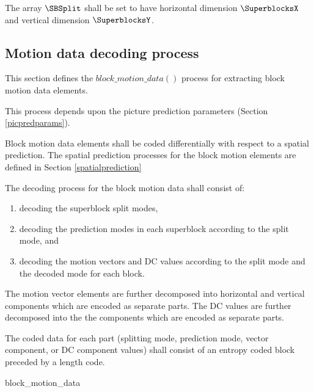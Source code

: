 The array $\SBSplit$ shall be set to have horizontal dimension $\SuperblocksX$ 
and vertical dimension $\SuperblocksY$.

\subsection{Motion data decoding process}
\label{decodingprocess}

This section defines the $block\_motion\_data()$ process for extracting
block motion data elements.

This process depends upon the picture prediction parameters (Section
 \ref{picpredparams}).

Block motion data elements shall be coded differentially with respect to a spatial
prediction.  The spatial prediction processes for the block motion elements are 
defined in Section \ref{spatialprediction}

The decoding process for the block motion data shall consist of: 
\begin{enumerate}
\item decoding the superblock split modes,
\item decoding the prediction modes in each superblock according to the split mode, and
\item decoding the motion vectors and DC values according to the split mode and the
 decoded mode for each block.
\end{enumerate}

The motion vector elements are further decomposed into horizontal and vertical 
components which are encoded as separate parts. The DC values are further
decomposed into the the components which are encoded as separate parts. 

The coded data for each part (splitting mode, prediction mode, vector component,
or DC component values) shall consist of an entropy coded block
 preceded by a length code. 

\begin{pseudo}{block\_motion\_data}{}
\bsEND
{}
\end{pseudo}

